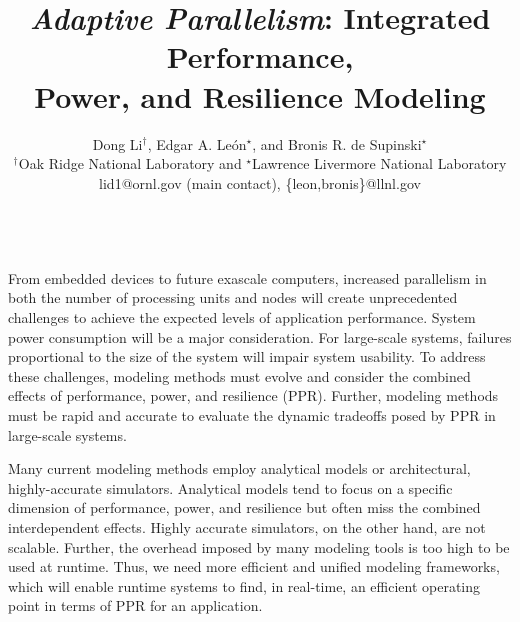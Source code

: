 \documentclass{article}  %
\begin{document}
\title{\emph{Adaptive Parallelism}: Integrated Performance, \\Power, and Resilience Modeling}


\author{Dong Li$^{\dag}$, Edgar A. Le{\'o}n$^{\star}$, and Bronis R. de Supinski$^{\star}$ \\
    $^{\dag}$Oak Ridge National Laboratory and $^{\star}$Lawrence Livermore National Laboratory \\
    lid1@ornl.gov (main contact), \{leon,bronis\}@llnl.gov	\\
}

\date{}

\maketitle

\\
From embedded devices to future exascale computers, increased
parallelism in both the number of processing units and nodes will
create unprecedented challenges to achieve the expected levels of
application performance. System power consumption will be a major 
consideration. For large-scale systems, failures proportional
to the size of the system will impair system usability. To address 
these challenges, modeling methods must evolve and consider the 
combined effects of performance, power, and resilience (PPR). 
Further, modeling methods must be rapid and accurate to evaluate 
the dynamic tradeoffs posed by PPR in large-scale systems. 


Many current modeling methods employ analytical models or architectural, 
highly-accurate simulators. Analytical models tend to focus on a specific 
dimension of performance, power, and resilience but often miss the combined 
interdependent effects. Highly accurate simulators, on the other hand, are 
not scalable. Further, the overhead imposed by many modeling tools is too 
high to be used at runtime. Thus, we need more efficient and unified modeling
frameworks, which will enable runtime systems to find, in real-time, an
efficient operating point in terms of PPR for an application. 
\end{document}
